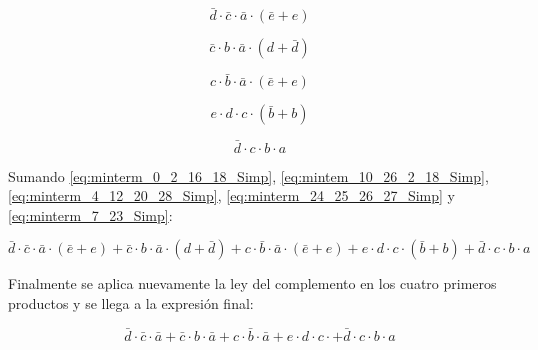 \begin{equation}\label{eq:minterm_0_2_16_18_Simp}
\bar{d} \cdot \bar{c} \cdot \bar{a} \cdot (\bar{e} + e)
\end{equation}

\begin{equation}\label{eq:mintem_10_26_2_18_Simp}
\bar{c} \cdot b \cdot \bar{a} \cdot (d + \bar{d})
\end{equation}

\begin{equation}\label{eq:minterm_4_12_20_28_Simp}
c \cdot \bar{b} \cdot \bar{a} \cdot (\bar{e} + e)
\end{equation}

\begin{equation}\label{eq:minterm_24_25_26_27_Simp}
e \cdot d \cdot c \cdot (\bar{b} + b)
\end{equation}

\begin{equation}\label{eq:minterm_7_23_Simp}
\bar{d} \cdot c \cdot b \cdot a 
\end{equation}

Sumando \ref{eq:minterm_0_2_16_18_Simp}, \ref{eq:mintem_10_26_2_18_Simp}, \ref{eq:minterm_4_12_20_28_Simp}, \ref{eq:minterm_24_25_26_27_Simp} y \ref{eq:minterm_7_23_Simp}:

\begin{equation}
\bar{d} \cdot \bar{c} \cdot \bar{a} \cdot (\bar{e} + e) + 
\bar{c} \cdot b \cdot \bar{a} \cdot (d + \bar{d}) + 
c \cdot \bar{b} \cdot \bar{a} \cdot (\bar{e} + e) + 
e \cdot d \cdot c \cdot (\bar{b} + b) +
\bar{d} \cdot c \cdot b \cdot a 
\end{equation}

Finalmente se aplica nuevamente la ley del complemento en los cuatro primeros productos y se llega a la expresión final:

\begin{equation}\label{canonica_minterm}
\boxed{\bar{d} \cdot \bar{c} \cdot \bar{a} + 
\bar{c} \cdot b \cdot \bar{a} + 
c \cdot \bar{b} \cdot \bar{a} + 
e \cdot d \cdot c \cdot + 
\bar{d} \cdot c \cdot b \cdot a}
\end{equation}


